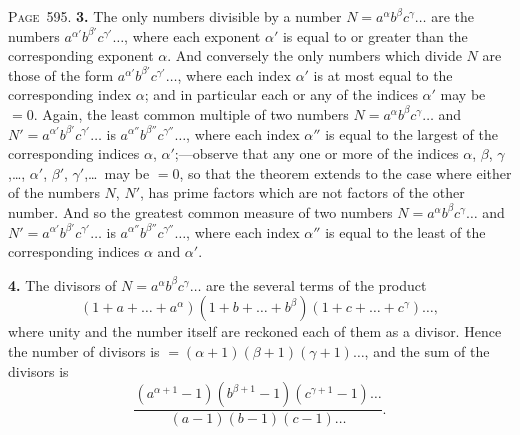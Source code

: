 \documentclass[11pt,a4paper]{book}
\begin{document}
\newpage
\noindent\textsc{Page~595.} \textbf{3.} The only numbers divisible by a number $N=a^\alpha b^\beta c^\gamma\ldots$ are the numbers $a^{\alpha'}b^{\beta'}c^{\gamma'}\ldots$, where each exponent $\alpha'$ is equal to or greater than the corresponding exponent $\alpha$. And conversely the only numbers which divide $N$ are those of the form $a^{\alpha'}b^{\beta'}c^{\gamma'}\ldots$, where each index $\alpha'$ is at most equal to the corresponding index $\alpha$; and in particular each or any of the indices $\alpha'$ may be $=0$. Again, the least common multiple of two numbers $N=a^\alpha b^\beta c^\gamma\ldots$ and $N'=a^{\alpha'}b^{\beta'}c^{\gamma'}\ldots$ is $a^{\alpha''}b^{\beta''}c^{\gamma''}\ldots$, where each index $\alpha''$ is equal to the largest of the corresponding indices $\alpha$, $\alpha'$;---observe that any one or more of the indices $\alpha$, $\beta$, $\gamma$,\ldots, $\alpha'$, $\beta'$, $\gamma'$,\ldots\ may be $=0$, so that the theorem extends to the case where either of the numbers $N$, $N'$, has prime factors which are not factors of the other number. And so the greatest common measure of two numbers $N=a^\alpha b^\beta c^\gamma\ldots$ and $N'=a^{\alpha'}b^{\beta'}c^{\gamma'}\ldots$ is $a^{\alpha''}b^{\beta''}c^{\gamma''}\ldots$, where each index $\alpha''$ is equal to the least of the corresponding indices $\alpha$ and $\alpha'$.

\textbf{4.} The divisors of $N=a^\alpha b^\beta c^\gamma\ldots$ are the several terms of the product
\[
(1+a+\ldots+a^\alpha)(1+b+\ldots+b^\beta)(1+c+\ldots+c^\gamma)\ldots,
\]
where unity and the number itself are reckoned each of them as a divisor. Hence the number of divisors is $=(\alpha+1)(\beta+1)(\gamma+1)\ldots$, and the sum of the divisors is
\[
\frac{(a^{\alpha+1}-1)(b^{\beta+1}-1)(c^{\gamma+1}-1)\ldots}{(a-1)(b-1)(c-1)\ldots}.
\]
\end{document}
